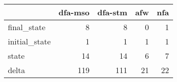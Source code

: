 \begin{tabular}{lrrrr}
\toprule
{} &  dfa-mso &  dfa-stm &  afw &  nfa \\
\midrule
final\_state   &        8 &        8 &    0 &    1 \\
initial\_state &        1 &        1 &    1 &    1 \\
state         &       14 &       14 &    6 &    7 \\
delta         &      119 &      111 &   21 &   22 \\
\bottomrule
\end{tabular}

